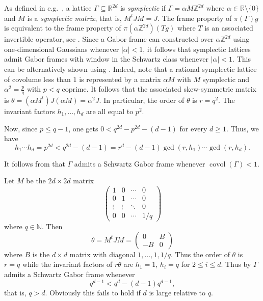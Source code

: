 \documentclass[reqno, a4paper]{amsart}
\numberwithin{equation}{section}
\newcommand{\N}{\mathbb{N}}   %
\newcommand{\Z}{\mathbb{Z}}   %
\DeclareMathOperator{\covol}{covol}
\begin{document}
\begin{example}
As defined in e.g.\ \cite[Definition~2]{GroHanHeil02}, a lattice $\Gamma\subseteq\mathbb{R}^{2d}$ is \emph{symplectic} if $\Gamma = \alpha M \mathbb{Z}^{2d}$ where $\alpha\in\mathbb{R}\setminus\{ 0\}$ and $M$ is a \emph{symplectic matrix}, that is, $M^t J M=J$. The frame property of $\pi(\Gamma)g$ is equivalent to the frame property of $\pi(\alpha \Z^{2d})(Tg)$ where $T$ is an associated invertible operator, see \cite[Section 9.4]{gr01}. Since a Gabor frame can constructed over $\alpha \Z^{2d}$ using one-dimensional Gaussians whenever $|\alpha| < 1$, it follows that symplectic lattices admit Gabor frames with window in the Schwartz class whenever $| \alpha | < 1$. This can be alternatively shown using . Indeed, note that a rational symplectic lattice of covolume less than $1$ is represented by a matrix $\alpha M$ with $M$ symplectic and $\alpha^2 = \tfrac{p}{q}$ with $p<q$ coprime. It follows that the associated skew-symmetric matrix is $\theta = (\alpha M^t)J(\alpha M)=\alpha^2 J$. In particular, the order of $\theta$ is $r=q^2$. The invariant factors $h_1,\ldots ,h_d$ are all equal to $p^2$.

Now, since $p\leq q-1$, one gets $0<q^{2d}-p^{2d}-(d-1)$ for every $d\geq 1$. Thus, we have
\[
    h_1 \cdots h_d = p^{2d} < q^{2d}-(d-1) = r^d - (d-1) \gcd(r,h_1) \cdots \gcd(r,h_d).
\]

It follows from  that $\Gamma$ admits a Schwartz Gabor frame whenever $\covol(\Gamma) < 1$.
\end{example}

\begin{example}
Let $M$ be the $2d \times 2d$ matrix
\[ \begin{pmatrix} 1 & 0 & \cdots & 0 \\ 0 & 1 & \cdots & 0 \\ \vdots & \vdots & \ddots & 0 \\ 0 & 0 & \cdots & 1/q \end{pmatrix} \]
where $q \in \N$. Then
\[ \theta = M^t J M = \begin{pmatrix} 0 & B \\ -B & 0 \end{pmatrix} \]
where $B$ is the $d \times d$ matrix with diagonal $1, \ldots, 1, 1/q$. Thus the order of $\theta$ is $r = q$ while the invariant factors of $r\theta$ are $h_1 = 1$, $h_i = q$ for $2 \leq i \leq d$. Thus by  $\Gamma$ admits a Schwartz Gabor frame whenever
\[ q^{d-1} < q^d - (d-1)q^{d-1} , \]
that is, $q > d$. Obviously this fails to hold if $d$ is large relative to $q$.
\end{example}
\end{document}
